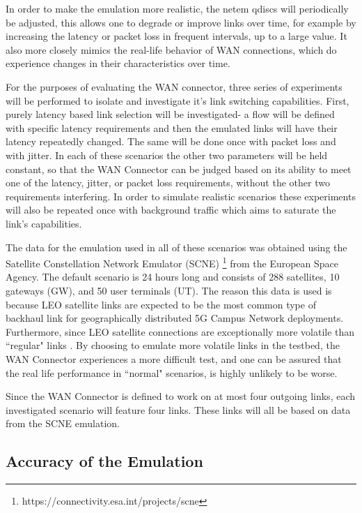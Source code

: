 In order to make the emulation more realistic, the netem qdiscs will periodically be adjusted, this allows one to degrade or improve links over time, for example by increasing the latency or packet loss in frequent intervals, up to a large value. It also more closely mimics the real-life behavior of WAN connections, which do experience changes in their characteristics over time.

For the purposes of evaluating the WAN connector, three series of experiments will be performed to isolate and investigate it's link switching capabilities. First, purely latency based link selection will be investigated- a flow will be defined with specific latency requirements and then the emulated links will have their latency repeatedly changed. The same will be done once with packet loss and with jitter. In each of these scenarios the other two parameters will be held constant, so that the WAN Connector can be judged based on its ability to meet one of the latency, jitter, or packet loss requirements, without the other two requirements interfering. In order to simulate realistic scenarios these experiments will also be repeated once with background traffic which aims to saturate the link's capabilities.

The data for the emulation used in all of these scenarios was obtained using the Satellite Constellation Network Emulator (SCNE) \footnote{https://connectivity.esa.int/projects/scne} from the European Space Agency. The default scenario is 24 hours long and consists of 288 satellites, 10 gateways (GW), and 50 user terminals (UT). The reason this data is used is because LEO satellite links are expected to be the most common type of backhaul link for geographically distributed 5G Campus Network deployments. Furthermore, since LEO satellite connections are exceptionally more volatile than “regular" links \cite{deutschmann2022broadband} \cite{ma2023network}. By choosing to emulate more volatile links in the testbed, the WAN Connector experiences a more difficult test, and one can be assured that the real life performance in “normal" scenarios, is highly unlikely to be worse.

Since the WAN Connector is defined to work on at most four outgoing links, each investigated scenario will feature four links. These links will all be based on data from the SCNE emulation.

\subsection{Accuracy of the Emulation}

